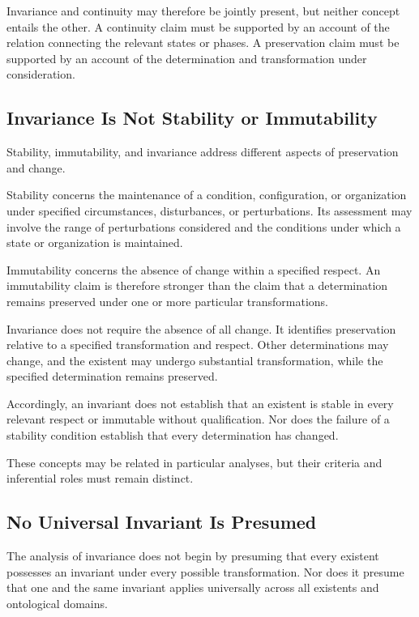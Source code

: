 Invariance and continuity may therefore be jointly present,
but neither concept entails the other. A continuity claim
must be supported by an account of the relation connecting
the relevant states or phases. A preservation claim must
be supported by an account of the determination and
transformation under consideration.

\subsection{Invariance Is Not Stability or Immutability}

Stability, immutability, and invariance address different
aspects of preservation and change.

Stability concerns the maintenance of a condition,
configuration, or organization under specified circumstances,
disturbances, or perturbations. Its assessment may involve
the range of perturbations considered and the conditions
under which a state or organization is maintained.

Immutability concerns the absence of change within a
specified respect. An immutability claim is therefore
stronger than the claim that a determination remains
preserved under one or more particular transformations.

Invariance does not require the absence of all change.
It identifies preservation relative to a specified
transformation and respect. Other determinations may
change, and the existent may undergo substantial
transformation, while the specified determination remains
preserved.

Accordingly, an invariant does not establish that an
existent is stable in every relevant respect or immutable
without qualification. Nor does the failure of a stability
condition establish that every determination has changed.

These concepts may be related in particular analyses,
but their criteria and inferential roles must remain distinct.

\subsection{No Universal Invariant Is Presumed}

The analysis of invariance does not begin by presuming
that every existent possesses an invariant under every
possible transformation. Nor does it presume that one
and the same invariant applies universally across all
existents and ontological domains.

